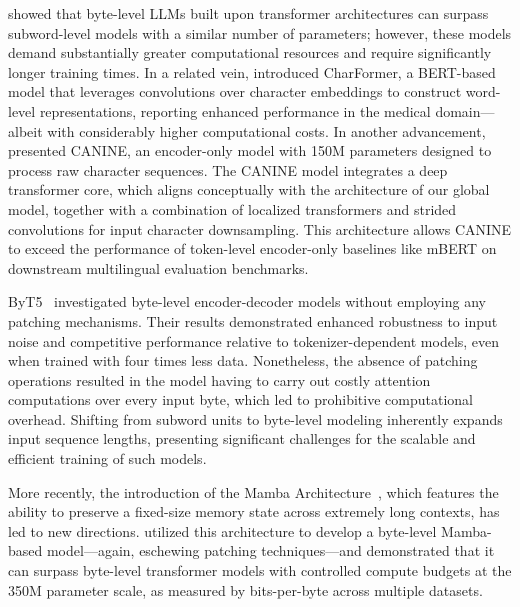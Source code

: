 \cite{Choe2019BridgingTG} showed that byte-level LLMs built upon transformer architectures can surpass subword-level models with a similar number of parameters; however, these models demand substantially greater computational resources and require significantly longer training times. In a related vein, \cite{el2020characterbert} introduced CharFormer, a BERT-based model that leverages convolutions over character embeddings to construct word-level representations, reporting enhanced performance in the medical domain—albeit with considerably higher computational costs. In another advancement, \cite{clark2022canine} presented CANINE, an encoder-only model with 150M parameters designed to process raw character sequences. The CANINE model integrates a deep transformer core, which aligns conceptually with the architecture of our global model, together with a combination of localized transformers and strided convolutions for input character downsampling. This architecture allows CANINE to exceed the performance of token-level encoder-only baselines like mBERT on downstream multilingual evaluation benchmarks. 

ByT5~\citep{xue2022byt5} investigated byte-level encoder-decoder models without employing any patching mechanisms. Their results demonstrated enhanced robustness to input noise and competitive performance relative to tokenizer-dependent models, even when trained with four times less data. Nonetheless, the absence of patching operations resulted in the model having to carry out costly attention computations over every input byte, which led to prohibitive computational overhead. Shifting from subword units to byte-level modeling inherently expands input sequence lengths, presenting significant challenges for the scalable and efficient training of such models.

More recently, the introduction of the Mamba Architecture~\citep{gu2023mamba}, which features the ability to preserve a fixed-size memory state across extremely long contexts, has led to new directions. \cite{wang2024mambabyte} utilized this architecture to develop a byte-level Mamba-based model—again, eschewing patching techniques—and demonstrated that it can surpass byte-level transformer models with controlled compute budgets at the 350M parameter scale, as measured by bits-per-byte across multiple datasets.

